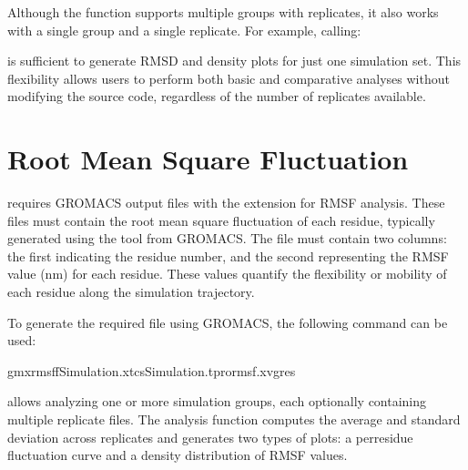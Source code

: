 \documentclass[a4paper,10pt,english]{sphinxmanual}
\begin{document}
\sphinxAtStartPar
Although the function supports multiple groups with replicates, it also works with a single group and a single replicate. For example, calling:

\begin{sphinxVerbatim}[commandchars=\\\{\}]
 
\end{sphinxVerbatim}

\sphinxAtStartPar
is sufficient to generate RMSD and density plots for just one simulation set. This flexibility allows users to perform both basic and comparative analyses without modifying the source code, regardless of the number of replicates available.


\section{Root Mean Square Fluctuation}
\label{\detokenize{Input:root-mean-square-fluctuation}}
\sphinxAtStartPar
{} requires GROMACS output files with the  extension for RMSF analysis. These files must contain the root mean square fluctuation of each residue, typically generated using the  tool from GROMACS. The  file must contain two columns: the first indicating the residue number, and the second representing the RMSF value (nm) for each residue. These values quantify the flexibility or mobility of each residue along the simulation trajectory.

\sphinxAtStartPar
To generate the required file using GROMACS, the following command can be used:

\begin{sphinxVerbatim}[commandchars=\\\{\}]
gmxrmsf\PYGZhy{}fSimulation.xtc\PYGZhy{}sSimulation.tpr\PYGZhy{}ormsf.xvg\PYGZhy{}res
\end{sphinxVerbatim}

\sphinxAtStartPar
{} allows analyzing one or more simulation groups, each optionally containing multiple replicate  files. The analysis function computes the average and standard deviation across replicates and generates two types of plots: a per\sphinxhyphen{}residue fluctuation curve and a density distribution of RMSF values.
\end{document}
